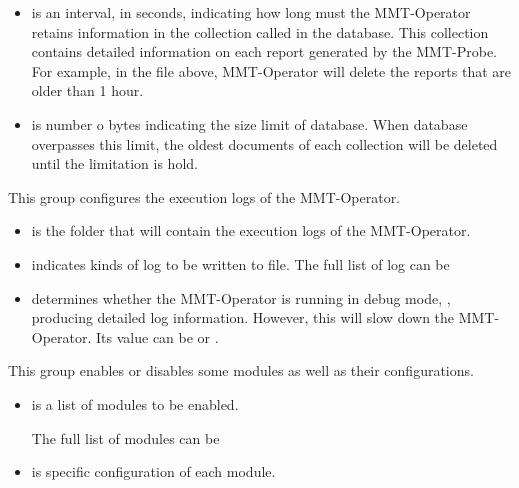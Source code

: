 \begin{itemize}
  
    \item {} is an interval, in seconds, indicating how long must the MMT-Operator retains information in the collection called  in the database. This collection contains detailed information on each report generated by the MMT-Probe. For example, in the file  above, MMT-Operator will delete the reports that are older than 1 hour.

    \item {} is number o bytes indicating the size limit of database. When database overpasses this limit, the oldest documents of each collection will be deleted until the limitation is hold. 
\end{itemize}

 This group configures the execution logs of the MMT-Operator.

\begin{itemize}
  
    \item {} is the folder that will contain the execution logs of the MMT-Operator.
    
    \item {} indicates kinds of log to be written to file. The full list of log can be
    
    \item {} determines whether the MMT-Operator is running in debug mode, \ie, producing detailed log information. However, this will slow down the MMT-Operator. Its value can be  or .
    
\end{itemize}

 This group enables or disables some modules as well as their configurations.

\begin{itemize}
  \item {} is a list of modules to be enabled.
  
  The full list of modules can be 
    
  
  \item {} is specific configuration of each module. 
\end{itemize}

